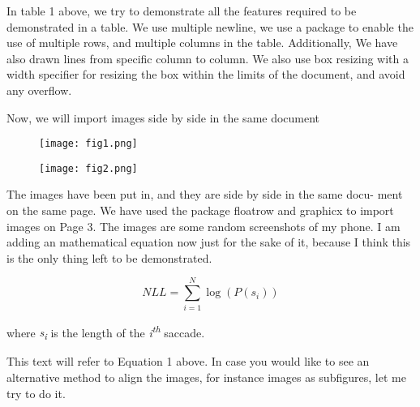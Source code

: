 \documentclass[15pt,a4paper]{article}
\begin{document}
{\Large In table 1 above, we try to demonstrate all the features
required to be demonstrated in a table.  We use multiple
newline, we use a package to enable the use of multiple rows,
and multiple columns in the table.  Additionally, We have
also drawn lines from specific column to column. We also
use box resizing with a width specifier for resizing the box
within the limits of the document, and avoid any overflow. }

\par
\vspace{5mm}

Now, we will import images side by side in the same document
\newpage



\begin{figure}
\centering
\begin{minipage}{0.5\textwidth}
  \centering
  \texttt{[image: fig1.png]}
  \label{fig:test1}
\end{minipage}%
\begin{minipage}{0.5\textwidth}
  \centering
  \texttt{[image: fig2.png]}
  \label{fig:test2}
\end{minipage}
\end{figure}

\fontsize{11}{14}\selectfont
\par
The images have been put in, and they are side by side in the same docu-
ment on the same page. We have used the package floatrow and graphicx to
import images on Page 3. The images are some random screenshots of my
phone. I am adding an mathematical equation now just for the sake of it,
because I think this is the only thing left to be demonstrated.

\begin{equation} \label{nll}
\textit{NLL}=\sum_{i=1}^{N}\log(P(s_i))
\end{equation}

\begin{flushleft}
where
\textit{s\textsubscript{i}} 
is the length of the \textit{i}\textsuperscript{\textit{th}} saccade.
\end{flushleft}


\par
This text will refer to Equation 1 above. In case you would like to see an
alternative method to align the images, for instance images as subfigures, let
me try to do it.

\newpage
\end{document}

